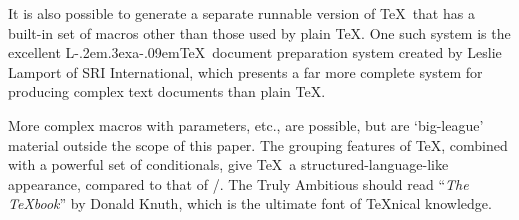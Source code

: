 It is also possible to generate a separate runnable version of
\TeX\ that has a built-in set of macros other than those used
by plain \TeX.  One such system is the excellent 
L\kern-.2em\raise.3ex\hbox{\csc a}\kern-.09em\TeX\
document preparation system created by Leslie Lamport of
SRI International, which presents a far more complete system
for producing complex text documents than plain \TeX.

More complex macros with parameters, etc., are possible, but
are `big-league' material outside the scope of this paper.
The grouping features of \TeX, combined with a powerful
set of conditionals,
give \TeX\ a structured-language-like
appearance, compared to that of \Troff/.
The Truly Ambitious should read ``{\sl The \TeX book\/}'' by Donald
Knuth, which is the ultimate font of \TeX nical knowledge.

